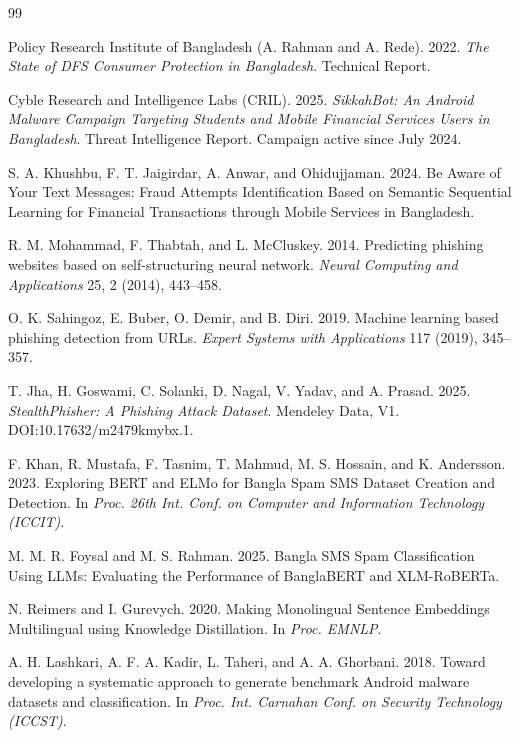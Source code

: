 \documentclass[preprint,12pt,number]{elsarticle}
\begin{document}
\begin{thebibliography}{99}

 Policy Research Institute of Bangladesh (A. Rahman and A. Rede). 2022. \emph{The State of DFS Consumer Protection in Bangladesh}. Technical Report.

 Cyble Research and Intelligence Labs (CRIL). 2025. \emph{SikkahBot: An Android Malware Campaign Targeting Students and Mobile Financial Services Users in Bangladesh}. Threat Intelligence Report. Campaign active since July 2024.

 S. A. Khushbu, F. T. Jaigirdar, A. Anwar, and Ohidujjaman. 2024. Be Aware of Your Text Messages: Fraud Attempts Identification Based on Semantic Sequential Learning for Financial Transactions through Mobile Services in Bangladesh.

 R. M. Mohammad, F. Thabtah, and L. McCluskey. 2014. Predicting phishing websites based on self-structuring neural network. \emph{Neural Computing and Applications} 25, 2 (2014), 443--458.

 O. K. Sahingoz, E. Buber, O. Demir, and B. Diri. 2019. Machine learning based phishing detection from URLs. \emph{Expert Systems with Applications} 117 (2019), 345--357.

 T. Jha, H. Goswami, C. Solanki, D. Nagal, V. Yadav, and A. Prasad. 2025. \emph{StealthPhisher: A Phishing Attack Dataset}. Mendeley Data, V1. DOI:10.17632/m2479kmybx.1.

 F. Khan, R. Mustafa, F. Tasnim, T. Mahmud, M. S. Hossain, and K. Andersson. 2023. Exploring BERT and ELMo for Bangla Spam SMS Dataset Creation and Detection. In \emph{Proc. 26th Int. Conf. on Computer and Information Technology (ICCIT)}.

 M. M. R. Foysal and M. S. Rahman. 2025. Bangla SMS Spam Classification Using LLMs: Evaluating the Performance of BanglaBERT and XLM-RoBERTa.

 N. Reimers and I. Gurevych. 2020. Making Monolingual Sentence Embeddings Multilingual using Knowledge Distillation. In \emph{Proc. EMNLP}.

 A. H. Lashkari, A. F. A. Kadir, L. Taheri, and A. A. Ghorbani. 2018. Toward developing a systematic approach to generate benchmark Android malware datasets and classification. In \emph{Proc. Int. Carnahan Conf. on Security Technology (ICCST)}.


\end{thebibliography}
\end{document}
